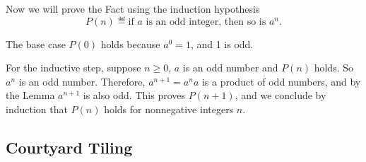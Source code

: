 Now we will prove the Fact using the induction hypothesis
\[
P(n) \eqdef \text{if $a$ is an odd integer, then so is $a^{n}$}.
\]

The base case $P(0)$ holds because $a^{0} =1$, and 1 is odd.

For the inductive step, suppose $n\geq 0$, $a$ is an odd number and $P(n)$
holds.  So $a^n$ is an odd number.  Therefore, $a^{n+1} = a^{n}a$ is a
product of odd numbers, and by the Lemma $a^{n+1}$ is also odd.  This
proves $P(n+1)$, and we conclude by induction that $P(n)$ holds for
nonnegative integers $n$.

\iffalse
An alternative proof of Lemma~\ref{finmin} that every partial order on a
nonempty finite set has a minimal element can be based on induction.  This
time there is no $n$ mentioned, so we better find one.

We'll use the induction hypothesis
\[
P(n) \eqdef \text{a strict partial order on a set of size $n$ has a minimal
  element}.
\]

As a base case, we'll use $n=1$.  Now $P(1)$ holds because in a
one-element partial order, the element is minimal (and maximal) by
definition.

For the inductive step, assume $P(n)$ holds and consider a strict partial
order, $R$, on a set, $A$, of size $n+1$ for $n \geq 1$.  We will prove
that $A$ has a minimal element.

Now $A$ has 2 or more elements, so pick one and call it $a_0$.  If $a_0$
is a minimal element, then we are done.  Otherwise, let $A'$ be the set $A
- \set{a_0}$ and $R'$ be the relation $R$ restricted to $A'$.

Now it's easy to check that $R'$ is a strict partial order on set $A'$
whose size is $n$.  So by induction, there is an $R'$-minimal element, $m
\in A'$.  We claim that $m$ is also a minimal element of $A$.

Now there is no element $a' \in A'$ such that $a'\,R\,m$, so to prove
$m$ is minimal in $A$,  as long as it is not true that $a_0\,R\, m$

This element $m$ will also be minimal in $A$ unless

Since $a_0$ is not minimal, there is an element $a_1 \in A'$ such that
$a_1\,R\,a_0$.

\fi

\subsection{Courtyard Tiling}

